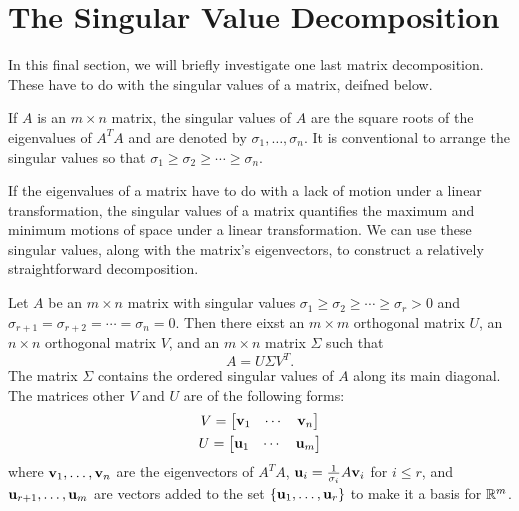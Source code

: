 \documentclass[../m73main.tex]{subfiles}
\begin{document}
\section{The Singular Value Decomposition}
In this final section, we will briefly investigate one last matrix decomposition.
These have to do with the singular values of a matrix, deifned below.

\begin{definition}
	If $A$ is an $m \times n$ matrix, the singular values of $A$ are the square roots of the eigenvalues of $A^T A$ and are denoted by $\sigma_1, \ldots, \sigma_n$. It is conventional to arrange the singular values so that $\sigma_1 \geq \sigma_2 \geq \cdots \geq \sigma_n$.
\end{definition}

If the eigenvalues of a matrix have to do with a lack of motion under a linear transformation, the singular values of a matrix quantifies the maximum and minimum motions of space under a linear transformation.
We can use these singular values, along with the matrix's eigenvectors, to construct a relatively straightforward decomposition.

\begin{theorem}
	Let $A$ be an $m \times n$ matrix with singular values $\sigma_1 \geq \sigma_2 \geq \cdots \geq \sigma_r > 0$ and $\sigma_{r+1} = \sigma_{r+2} = \cdots = \sigma_n = 0$.
	Then there eixst an $m \times m$ orthogonal matrix $U$, an $n \times n$ orthogonal matrix $V$, and an $m \times n$ matrix $\Sigma$ such that
	\[ A = U \Sigma V^T. \]
	The matrix $\Sigma$ contains the ordered singular values of $A$ along its main diagonal.
	The matrices other $V$ and $U$ are of the following forms:
	\begin{gather*}
		V = \begin{bmatrix} \mathbf{v}_1 & \cdots & \mathbf{v}_n \end{bmatrix} \\
		U = \begin{bmatrix} \mathbf{u}_1 & \cdots & \mathbf{u}_m \end{bmatrix}
	\end{gather*}
	where $\mathbf{v}_1, \ldots, \mathbf{v}_n$ are the eigenvectors of $A^T A$, $\mathbf{u}_i = \frac{1}{\sigma_i} A \mathbf{v}_i$ for $i \leq r$, and $\mathbf{u}_{r+1}, \ldots, \mathbf{u}_m$ are vectors added to the set $\{ \mathbf{u}_1, \ldots, \mathbf{u}_r \}$ to make it a basis for $\mathbb{R}^m$.
\end{theorem}
\end{document}
